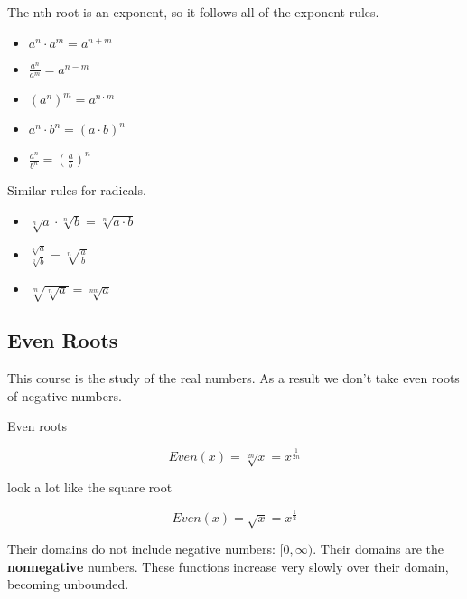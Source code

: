 \documentclass{ximera}
\begin{document}
The nth-root is an exponent, so it follows all of the exponent rules.


\begin{itemize}
\item $a^n \cdot a^m = a^{n+m}$

\item $\frac{a^n}{a^m} = a^{n-m}$

\item $(a^n)^m = a^{n \cdot m}$

\item $a^n \cdot b^n = (a \cdot b)^n$

\item $\frac{a^n}{b^n} = \left(\frac{a}{b}\right)^n$


\end{itemize}



Similar rules for radicals.

\begin{itemize}

\item $\sqrt[n]{a} \cdot \sqrt[n]{b} = \sqrt[n]{a \cdot b}$

\item $\frac{\sqrt[n]{a}}{\sqrt[n]{b}} = \sqrt[n]{\frac{a}{b}}$

\item $\sqrt[m]{\sqrt[n]{a}} = \sqrt[nm]{a}$

\end{itemize}








\subsection*{Even Roots}

This course is the study of the real numbers. As a result we don't take even roots of negative numbers.

Even roots

\[   Even(x) = \sqrt[2n]{x} = x^{\tfrac{1}{2n}}          \]

look a lot like the square root


\[   Even(x) = \sqrt{x} = x^{\tfrac{1}{2}}          \]



Their domains do not include negative numbers: $[0, \infty)$.  Their domains are the \textbf{nonnegative} numbers.  These functions increase very slowly over their domain, becoming unbounded.
\end{document}
